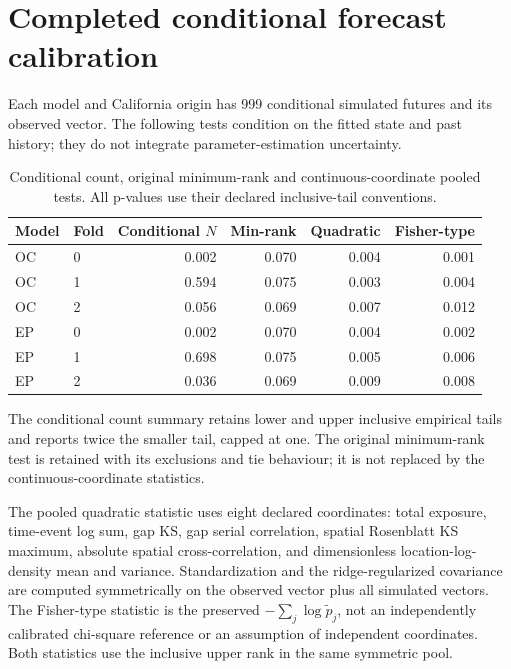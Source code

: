 \section{Completed conditional forecast calibration}

\label{sec:s05-completed}

Each model and California origin has 999 conditional simulated futures and its observed vector. The following tests condition on the fitted state and past history; they do not integrate parameter-estimation uncertainty.

\begin{table}[htbp]\centering\caption{Conditional count, original minimum-rank and continuous-coordinate pooled tests. All p-values use their declared inclusive-tail conventions.}\label{tab:s05-completed}

\begin{tabular}{llrrrr}\toprule Model & Fold & Conditional $N$ & Min-rank & Quadratic & Fisher-type\\\midrule

OC & 0 & 0.002 & 0.070 & 0.004 & 0.001 \\

OC & 1 & 0.594 & 0.075 & 0.003 & 0.004 \\

OC & 2 & 0.056 & 0.069 & 0.007 & 0.012 \\

EP & 0 & 0.002 & 0.070 & 0.004 & 0.002 \\

EP & 1 & 0.698 & 0.075 & 0.005 & 0.006 \\

EP & 2 & 0.036 & 0.069 & 0.009 & 0.008 \\

\bottomrule\end{tabular}\end{table}

The conditional count summary retains lower and upper inclusive empirical tails and reports twice the smaller tail, capped at one. The original minimum-rank test is retained with its exclusions and tie behaviour; it is not replaced by the continuous-coordinate statistics.

The pooled quadratic statistic uses eight declared coordinates: total exposure, time-event log sum, gap KS, gap serial correlation, spatial Rosenblatt KS maximum, absolute spatial cross-correlation, and dimensionless location-log-density mean and variance. Standardization and the ridge-regularized covariance are computed symmetrically on the observed vector plus all simulated vectors. The Fisher-type statistic is the preserved $-\sum_j\log\widetilde p_j$, not an independently calibrated chi-square reference or an assumption of independent coordinates. Both statistics use the inclusive upper rank in the same symmetric pool.


